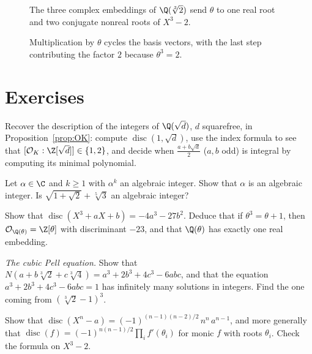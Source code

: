 \begin{figure}[ht]
\centering
{}
\caption{The three complex embeddings of $\Q(\sqrt[3]2)$ send $\theta$ to one real root and two conjugate nonreal roots of $X^3-2$.}
\label{fig:v13-extra-03-a}
\end{figure}

\begin{figure}[ht]
\centering
{}
\caption{Multiplication by $\theta$ cycles the basis vectors, with the last step contributing the factor $2$ because $\theta^3=2$.}
\label{fig:v13-extra-03-b}
\end{figure}

\section{Exercises}

\begin{exercise}[$\star$]\label{ex:quadratic}
Recover the description of the integers of $\Q(\sqrt d)$, $d$ squarefree, in Proposition~\ref{prop:OK}: compute
$\operatorname{disc}(1,\sqrt d)$, use the index formula to see that $[\mathcal O_K:\Z[\sqrt d]]\in\{1,2\}$, and decide
when $\frac{a+b\sqrt d}2$ ($a,b$ odd) is integral by computing its minimal polynomial.
\end{exercise}

\begin{exercise}[$\star$]\label{ex:roots}
Let $\alpha\in\C$ and $k\ge1$ with $\alpha^k$ an algebraic integer. Show that $\alpha$ is an algebraic integer. Is
$\sqrt{1+\sqrt2}+\sqrt[5]{3}$ an algebraic integer?
\end{exercise}

\begin{exercise}[$\star$]\label{ex:disccubic}
Show that $\operatorname{disc}(X^3+aX+b)=-4a^3-27b^2$. Deduce that if $\theta^3=\theta+1$, then
$\mathcal O_{\Q(\theta)}=\Z[\theta]$ with discriminant $-23$, and that $\Q(\theta)$ has exactly one real embedding.
\end{exercise}

\begin{exercise}[$\star\star$]\label{ex:normform}
\emph{The cubic Pell equation.} Show that $N(a+b\sqrt[3]2+c\sqrt[3]4)=a^3+2b^3+4c^3-6abc$, and that the equation
$a^3+2b^3+4c^3-6abc=1$ has infinitely many solutions in integers. Find the one coming from $(\sqrt[3]2-1)^3$.
\end{exercise}

\begin{exercise}[$\star\star$]\label{ex:discbinom}
Show that $\operatorname{disc}(X^n-a)=(-1)^{(n-1)(n-2)/2}\,n^n\,a^{n-1}$, and more generally that
$\operatorname{disc}(f)=(-1)^{n(n-1)/2}\prod_if'(\theta_i)$ for monic $f$ with roots $\theta_i$. Check the formula on
$X^3-2$.
\end{exercise}

